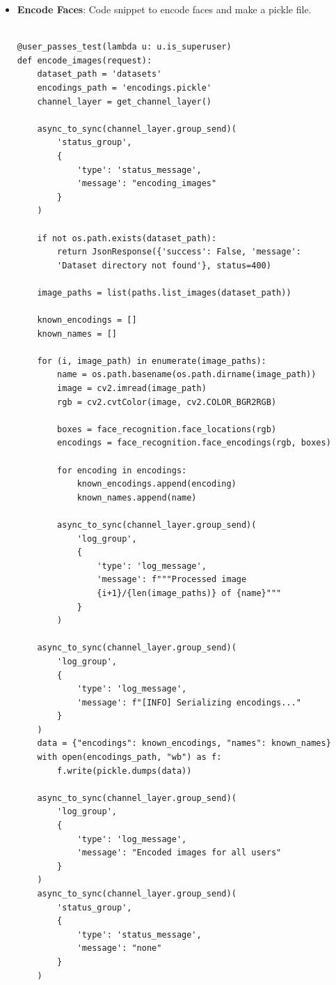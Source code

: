 \begin{itemize}
\item \textbf{Encode Faces}: Code snippet to encode faces and make a pickle file.

\begin{verbatim}

@user_passes_test(lambda u: u.is_superuser)
def encode_images(request):
    dataset_path = 'datasets'
    encodings_path = 'encodings.pickle'
    channel_layer = get_channel_layer()

    async_to_sync(channel_layer.group_send)(
        'status_group',
        {
            'type': 'status_message',
            'message': "encoding_images"
        }
    )

    if not os.path.exists(dataset_path):
        return JsonResponse({'success': False, 'message':
        'Dataset directory not found'}, status=400)

    image_paths = list(paths.list_images(dataset_path))

    known_encodings = []
    known_names = []

    for (i, image_path) in enumerate(image_paths):
        name = os.path.basename(os.path.dirname(image_path))
        image = cv2.imread(image_path)
        rgb = cv2.cvtColor(image, cv2.COLOR_BGR2RGB)

        boxes = face_recognition.face_locations(rgb)
        encodings = face_recognition.face_encodings(rgb, boxes)

        for encoding in encodings:
            known_encodings.append(encoding)
            known_names.append(name)

        async_to_sync(channel_layer.group_send)(
            'log_group',
            {
                'type': 'log_message',
                'message': f"""Processed image
                {i+1}/{len(image_paths)} of {name}"""
            }
        )

    async_to_sync(channel_layer.group_send)(
        'log_group',
        {
            'type': 'log_message',
            'message': f"[INFO] Serializing encodings..."
        }
    )
    data = {"encodings": known_encodings, "names": known_names}
    with open(encodings_path, "wb") as f:
        f.write(pickle.dumps(data))

    async_to_sync(channel_layer.group_send)(
        'log_group',
        {
            'type': 'log_message',
            'message': "Encoded images for all users"
        }
    )
    async_to_sync(channel_layer.group_send)(
        'status_group',
        {
            'type': 'status_message',
            'message': "none"
        }
    )


\end{verbatim}
\end{itemize}

